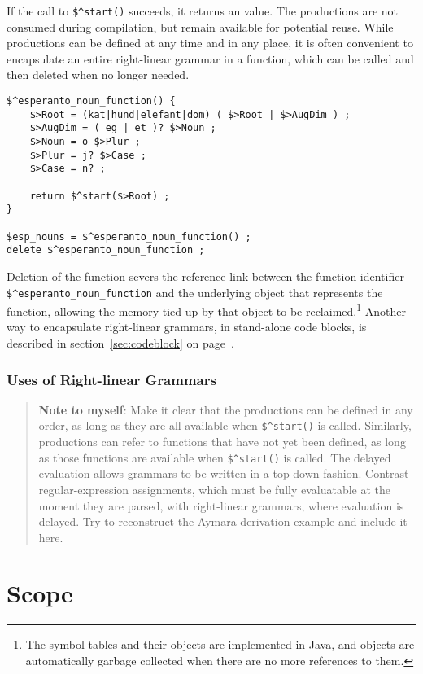 If the call to \verb!$^start()! succeeds, it returns an \fsm{} value.  The
productions are not consumed during compilation, but remain available for
potential reuse.  While productions can be defined at any time and in any
place, it is often convenient to encapsulate an entire right-linear grammar
in a function, which can be called and then deleted when no longer
needed.

\begin{Verbatim}
$^esperanto_noun_function() {
	$>Root = (kat|hund|elefant|dom) ( $>Root | $>AugDim ) ;
	$>AugDim = ( eg | et )? $>Noun ;
	$>Noun = o $>Plur ;
	$>Plur = j? $>Case ;
	$>Case = n? ;

	return $^start($>Root) ;
}

$esp_nouns = $^esperanto_noun_function() ;
delete $^esperanto_noun_function ;
\end{Verbatim}

Deletion of the function severs the reference link between the function
identifier \verb!$^esperanto_noun_function! and the underlying object that
represents the function, allowing the memory tied up by that object to be
reclaimed.\footnote{The symbol tables and their objects are implemented in
Java, and objects are automatically garbage collected when there are no
more references to them.}  Another way to encapsulate right-linear
grammars, in stand-alone code blocks, is described in
section~\ref{sec:codeblock} on page~\pageref{sec:codeblock}.

\subsubsection{Uses of Right-linear Grammars}

\begin{quote}
\textbf{Note to myself}:   Make it clear that the productions can be defined in any order, as long as they
are all available when \verb!$^start()! is called. Similarly,
productions can refer to functions that have not yet been defined,
as long as those functions are available when \verb!$^start()! is
called.  The delayed evaluation allows grammars to be written in a top-down fashion.  Contrast
regular-expression assignments, which must be fully evaluatable at the
moment they are parsed, with right-linear grammars, where
evaluation is delayed.
Try to reconstruct the Aymara-derivation example and include it here.  
\end{quote}



\section{Scope}

